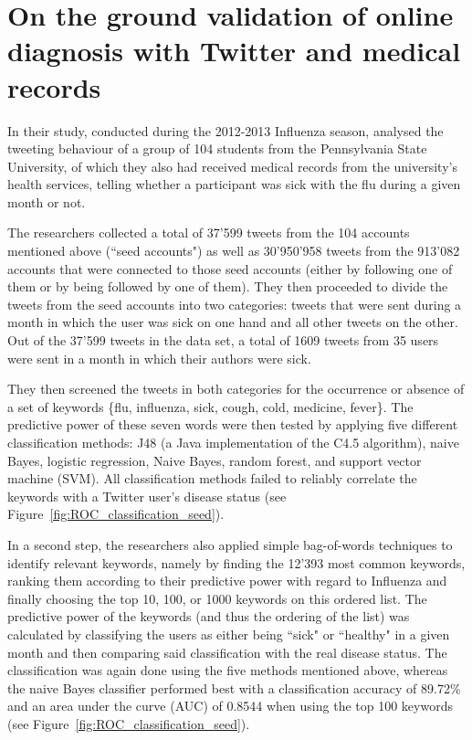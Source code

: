 \documentclass[11pt, a4paper,twoside]{report}\usepackage[]{graphicx}\usepackage[]{color}
\begin{document}
\section[On the ground validation of online diagnosis]{On the ground validation of online diagnosis with Twitter and medical records}
\label{sec:on_the_ground}
In their study, conducted during the 2012-2013 Influenza season, \cite{bodnar_ground_2014} analysed the tweeting behaviour of a group of 104 students from the Pennsylvania State University, of which they also had received medical records from the university's health services, telling whether a participant was sick with the flu during a given month or not.

The researchers collected a total of 37'599 tweets from the 104 accounts mentioned above (``seed accounts") as well as 30'950'958 tweets from the 913'082 accounts that were connected to those seed accounts (either by following one of them or by being followed by one of them). They then proceeded to divide the tweets from the seed accounts into two categories: tweets that were sent during a month in which the user was sick on one hand and all other tweets on the other. Out of the 37'599 tweets in the data set, a total of 1609 tweets from 35 users were sent in a month in which their authors were sick.

They then screened the tweets in both categories for the occurrence or absence of a set of keywords \{flu, influenza, sick, cough, cold, medicine, fever\}. The predictive power of these seven words were then tested by applying five different classification methods: J48 (a Java implementation of the C4.5 algorithm), naive Bayes, logistic regression, Naive Bayes, random forest, and support vector machine (SVM). All classification methods failed to reliably correlate the keywords with a Twitter user's disease status (see Figure~\ref{fig:ROC_classification_seed}).

In a second step, the researchers also applied simple bag-of-words techniques to identify relevant keywords, namely by finding the 12'393 most common keywords, ranking them according to their predictive power with regard to Influenza and finally choosing the top 10, 100, or 1000 keywords on this ordered list. The predictive power of the keywords (and thus the ordering of the list) was calculated by classifying the users as either being ``sick" or ``healthy" in a given month and then comparing said classification with the real disease status. The classification was again done using the five methods mentioned above, whereas the naive Bayes classifier performed best with a classification accuracy of 89.72\% and an area under the curve (AUC) of 0.8544 when using the top 100 keywords (see Figure~\ref{fig:ROC_classification_seed}).
\end{document}
